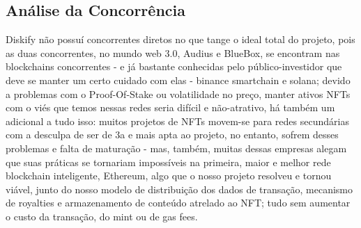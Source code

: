 \documentclass[onecolumn,12pt]{asme2ej}
\begin{document}
\subsection{Análise da Concorrência}

Diskify não possuí concorrentes diretos no que tange o ideal total do projeto, pois as duas concorrentes, no mundo web 3.0, Audius e BlueBox, se encontram nas blockchains concorrentes - e já bastante conhecidas pelo público-investidor que deve se manter um certo cuidado com elas - binance smartchain e solana; devido a problemas com o Proof-Of-Stake ou volatilidade no preço, manter ativos NFTs com o viés que temos nessas redes seria difícil e não-atrativo, há também um adicional a tudo isso: muitos projetos de NFTs movem-se para redes secundárias com a desculpa de ser de 3a e mais apta ao projeto, no entanto, sofrem desses problemas e falta de maturação - mas, também, muitas dessas empresas alegam que suas práticas se tornariam impossíveis na primeira, maior e melhor rede blockchain inteligente, Ethereum, algo que o nosso projeto resolveu e tornou viável, junto do nosso modelo de distribuição dos dados de transação, mecanismo de royalties e armazenamento de conteúdo atrelado ao NFT; tudo sem aumentar o custo da transação, do mint ou de gas fees. 
\end{document}
